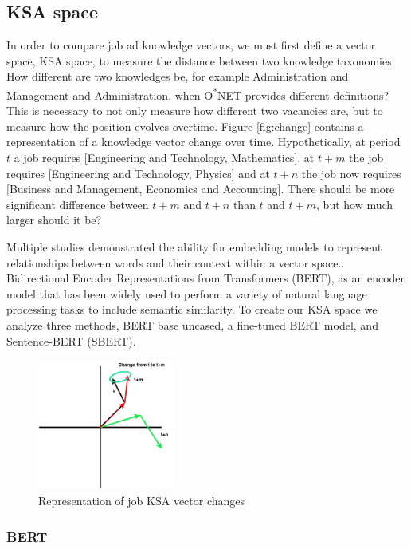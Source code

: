 \documentclass[12pt]{article}
\begin{document}
\subsection{KSA space}

In order to compare job ad knowledge vectors, we must first define a vector space, KSA space, to measure the distance between two knowledge taxonomies. How different are two knowledges be, for example Administration and Management and Administration, when O\textsuperscript{*}NET provides different definitions? This is necessary to not only measure how different two vacancies are, but to measure how the position evolves overtime. Figure \ref{fig:change} contains a representation of a knowledge vector change over time. Hypothetically, at period $t$ a job requires [Engineering and Technology, Mathematics], at $t+m$ the job requires [Engineering and Technology, Physics] and at $t+n$ the job now requires [Business and Management, Economics and Accounting]. There should be more significant difference between $t+m$ and $t+n$ than $t$ and $t+m$, but how much larger should it be?

Multiple studies demonstrated the ability for embedding models to represent relationships between words and their context within a vector space.\cite{domain_sepcific_words, word_phrases}. Bidirectional Encoder Representations from Transformers (BERT), as an encoder model that has been widely used to perform a variety of natural language processing tasks to include semantic similarity. To create our KSA space we analyze three methods, BERT base uncased, a fine-tuned BERT model, and Sentence-BERT (SBERT).

\begin{figure}[ht!]
    \centering
    \includegraphics[width=0.4\textwidth]{images/task_change_w_time.png}
    \caption{Representation of job KSA vector changes}
\end{figure}\label{fig:change}

\subsubsection{BERT}
\end{document}
